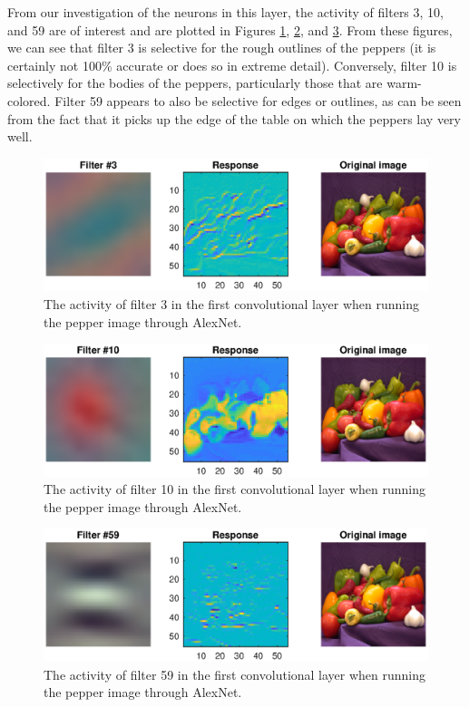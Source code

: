 \documentclass[11pt, oneside]{article}
\begin{document}
From our investigation of the neurons in this layer, the activity of filters 3, 10, and 59 are of interest and are plotted in Figures \ref{fig:f3}, \ref{fig:f10}, and \ref{fig:f59}. From these figures, we can see that filter 3 is selective for the rough outlines of the peppers (it is certainly not 100\% accurate or does so in extreme detail). Conversely, filter 10 is selectively for the bodies of the peppers, particularly those that are warm-colored. Filter 59 appears to also be selective for edges or outlines, as can be seen from the fact that it picks up the edge of the table on which the peppers lay very well. 
\begin{figure}[ht!]
\includegraphics[width=1\textwidth]{filter3.eps}
\caption{The activity of filter 3 in the first convolutional layer when running the pepper image through AlexNet.}
\label{fig:f3}
\end{figure}

\begin{figure}[ht!]
\includegraphics[width=1\textwidth]{filter10.eps}
\caption{The activity of filter 10 in the first convolutional layer when running the pepper image through AlexNet.}
\label{fig:f10}
\end{figure}

\begin{figure}[ht!]
\includegraphics[width=1\textwidth]{filter59.eps}
\caption{The activity of filter 59 in the first convolutional layer when running the pepper image through AlexNet.}
\label{fig:f59}
\end{figure}
\end{document}
